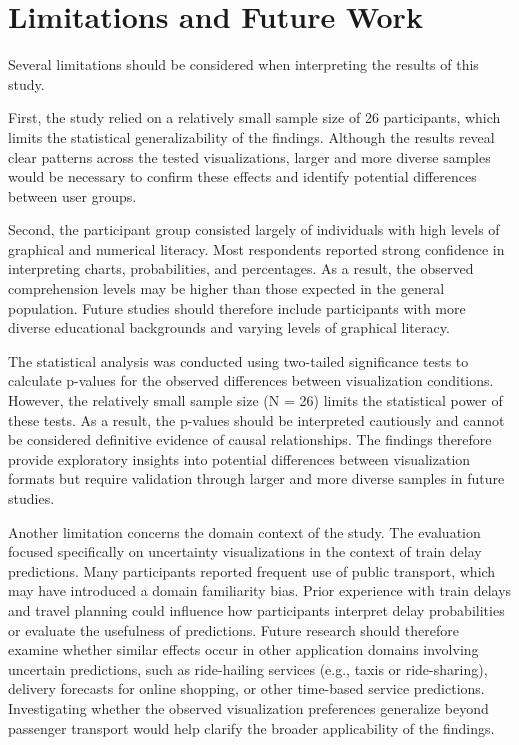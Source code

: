 \documentclass[final,journal,a4paper]{IEEEtran}
\begin{document}
\section{Limitations and Future Work} \label{Limitations and Future Work}
Several limitations should be considered when interpreting the results of this study.

First, the study relied on a relatively small sample size of 26 participants, which limits the statistical generalizability of the findings. Although the results reveal clear patterns across the tested visualizations, larger and more diverse samples would be necessary to confirm these effects and identify potential differences between user groups.

Second, the participant group consisted largely of individuals with high levels of graphical and numerical literacy. Most respondents reported strong confidence in interpreting charts, probabilities, and percentages. As a result, the observed comprehension levels may be higher than those expected in the general population. Future studies should therefore include participants with more diverse educational backgrounds and varying levels of graphical literacy.

The statistical analysis was conducted using two-tailed significance tests to calculate p-values for the observed differences between visualization conditions. However, the relatively small sample size (N = 26) limits the statistical power of these tests. As a result, the p-values should be interpreted cautiously and cannot be considered definitive evidence of causal relationships. The findings therefore provide exploratory insights into potential differences between visualization formats but require validation through larger and more diverse samples in future studies.

Another limitation concerns the domain context of the study. The evaluation focused specifically on uncertainty visualizations in the context of train delay predictions. Many participants reported frequent use of public transport, which may have introduced a domain familiarity bias. Prior experience with train delays and travel planning could influence how participants interpret delay probabilities or evaluate the usefulness of predictions. Future research should therefore examine whether similar effects occur in other application domains involving uncertain predictions, such as ride-hailing services (e.g., taxis or ride-sharing), delivery forecasts for online shopping, or other time-based service predictions. Investigating whether the observed visualization preferences generalize beyond passenger transport would help clarify the broader applicability of the findings.
\end{document}
